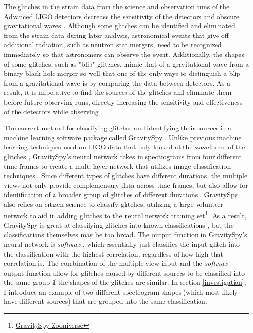 \documentclass[a4paper]{article}
\begin{document}
The glitches in the strain data from the science and observation runs of the Advanced LIGO detectors decrease the sensitivity of the detectors and obscure gravitational waves \cite{Zevin:2016}. Although some glitches can be identified and eliminated from the strain data during later analysis, astronomical events that give off additional radiation, such as neutron star mergers, need to be recognized immediately so that astronomers can observe the event. Additionally, the shapes of some glitches, such as "blip" glitches, mimic that of a gravitational wave from a binary black hole merger so well that one of the only ways to distinguish a blip from a gravitational wave is by comparing the data between detectors. As a result, it is imperative to find the sources of the glitches and eliminate them before future observing runs, directly increasing the sensitivity and effectiveness of the detectors while observing \cite{Mukherjee:2010}. 

The current method for classifying glitches and identifying their sources is a machine learning software package called GravitySpy \cite{Zevin:2016}. Unlike previous machine learning techniques used on LIGO data that only looked at the waveforms of the glitches \cite{Mukherjee:2010}, GravitySpy's neural network takes in spectrograms from four different time frames to create a multi-layer network that utilizes image classification techniques \cite{Bahaadini:2017}. Since different types of glitches have different durations, the multiple views not only provide complementary data across time frames, but also allow for identification of a broader group of glitches of different durations \cite{Bahaadini:2017}. GravitySpy also relies on citizen science to classify glitches, utilizing a large volunteer network to aid in adding glitches to the neural network training set\footnote{\href{https://www.zooniverse.org/projects/zooniverse/gravity-spy}{GravitySpy Zooniverse}}. As a result, GravitySpy is great at classifying glitches into known classifications \cite{Zevin:2016}, but the classifications themselves may be too broad. The output function in GravitySpy's neural network is \textit{softmax} \cite{Bahaadini:2017}, which essentially just classifies the input glitch into the classification with the highest correlation, regardless of how high that correlation is. The combination of the multiple-view input and the \textit{softmax} output function allow for glitches caused by different sources to be classified into the same group if the shapes of the glitches are similar. In section \ref{investigation}, I introduce an example of two different spectrogram shapes (which most likely have different sources) that are grouped into the same classification. 
\end{document}
